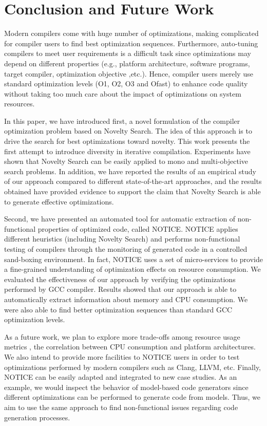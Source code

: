 \section{Conclusion and Future Work}
Modern compilers come with huge number of optimizations, making complicated for compiler users to find best optimization sequences. Furthermore, auto-tuning compilers to meet user requirements is a difficult task since optimizations may depend on different properties (e.g., platform architecture, software programs, target compiler, optimization objective ,etc.).
Hence, compiler users merely use standard optimization levels (O1, O2, O3 and Ofast) to enhance code quality without taking too much care about the impact of optimizations on system resources.

In this paper, we have introduced first, a novel formulation of the compiler optimization problem based on Novelty Search. The idea of this approach is to drive the search for best optimizations toward novelty. This work presents the first attempt to introduce diversity in iterative compilation. Experiments have shown that Novelty Search can be easily applied to mono and multi-objective search problems. In addition, we have reported the results of an empirical study of our approach compared to different state-of-the-art approaches, and the results obtained have provided evidence to support the claim that Novelty Search is able to generate effective optimizations.

Second, we have presented an automated tool for automatic extraction of non-functional properties of optimized code, called NOTICE. NOTICE applies different heuristics (including Novelty Search) and performs non-functional testing of compilers through the monitoring of generated code in a controlled sand-boxing environment. In fact, NOTICE uses a set of micro-services to provide a fine-grained understanding of optimization effects on resource consumption. 
We evaluated the effectiveness of our approach by verifying the optimizations performed by GCC compiler. 
Results showed that our approach is able to automatically extract information about memory and CPU consumption. We were also able to find better optimization sequences than standard GCC optimization levels.

As a future work, we plan to explore more trade-offs among resource usage metrics \eg, the correlation between CPU consumption and platform architectures. 
We also intend to provide more facilities to NOTICE users in order to test optimizations performed by modern compilers such as Clang, LLVM, etc.
Finally, NOTICE can be easily adapted and integrated to new case studies. As an example, we would inspect the behavior of model-based code generators since different optimizations can be performed to generate code from models\cite{stuermer2007systematic}. Thus, we aim to use the same approach to find non-functional issues regarding code generation processes.



